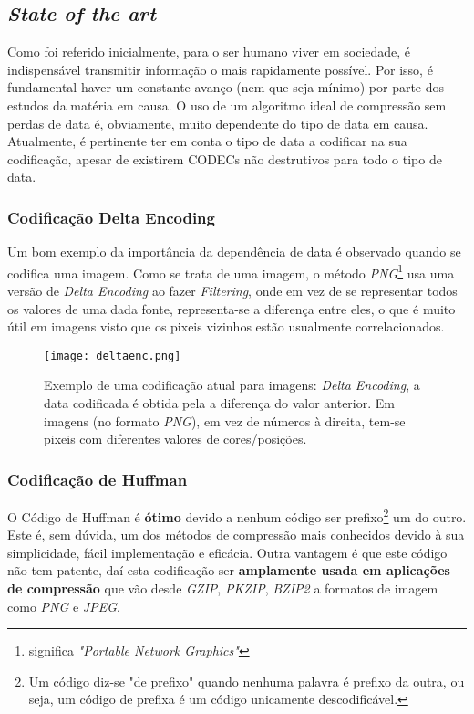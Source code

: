 \documentclass[10pt,journal,compsoc]{IEEEtran}
\begin{document}
    \subsection{\textit{State of the art}}
    Como foi referido inicialmente, para o ser humano viver em sociedade, é indispensável transmitir informação o mais rapidamente possível. Por isso, é fundamental haver um constante avanço (nem que seja mínimo) por parte dos estudos da matéria em causa. O uso de um algoritmo ideal de compressão sem perdas de data é, obviamente, muito dependente do tipo de data em causa.\\
    Atualmente, é pertinente ter em conta o tipo de data a codificar na sua codificação, apesar de existirem CODECs não destrutivos para todo o tipo de data.
    
    \subsubsection{Codificação \textbf{Delta Encoding}} 
    Um bom exemplo da importância da dependência de data é observado quando se codifica uma imagem. Como se trata de uma imagem, o método \textit{PNG}\footnote{significa \textit{"Portable Network Graphics"}} usa uma versão de  \textit{Delta Encoding} ao fazer \textit{Filtering}, onde em vez de se representar todos os valores de uma dada fonte, representa-se a diferença entre eles, o que é muito útil em imagens visto que os pixeis vizinhos estão usualmente correlacionados.
    \begin{figure}[htp]
    \texttt{[image: deltaenc.png]}
    \caption{Exemplo de uma codificação atual para imagens: \textit{Delta Encoding}, a data codificada é obtida pela a diferença do valor anterior. Em imagens (no formato \textit{PNG}), em vez de números à direita, tem-se pixeis com diferentes valores de cores/posições.}
    \end{figure}
    
    \subsubsection{Codificação de \textbf{Huffman}} 
    
    O Código de Huffman é \textbf{ótimo} devido a nenhum código ser prefixo\footnote{Um código diz-se "de prefixo" quando nenhuma palavra é prefixo da outra, ou seja, um código de prefixa é um código unicamente descodificável.} um do outro. Este é, sem dúvida, um dos métodos de compressão mais conhecidos devido à sua simplicidade, fácil implementação e eficácia. Outra vantagem é que este código não tem patente, daí esta codificação ser \textbf{amplamente usada em aplicações de compressão} que vão desde \textit{GZIP}, \textit{PKZIP}, \textit{BZIP2} a formatos de imagem como \textit{PNG} e \textit{JPEG}.
    
\end{document}
